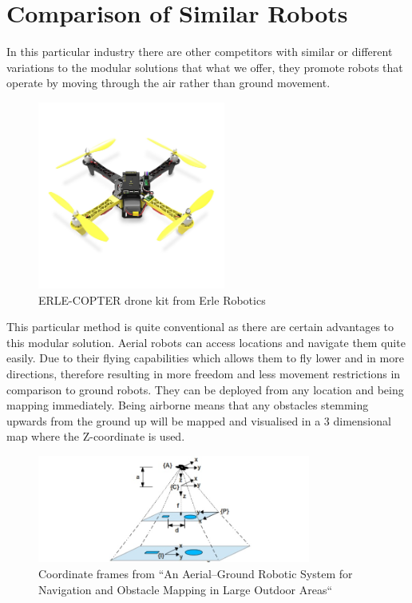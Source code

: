 \documentclass[12pt]{report}
\begin{document}
\section{Comparison of Similar Robots}
In this particular industry there are other competitors with similar or different variations to the modular solutions that what we offer, they promote robots that operate by moving through the air rather than ground movement.\par
\begin{figure}[H]
        \centering
        \includegraphics[width=0.55\textwidth]{Fig12.png}
        \caption{ERLE-COPTER drone kit from Erle Robotics}
        \label{fig:12}
\end{figure}
This particular method is quite conventional as there are certain advantages to this modular solution. Aerial robots can access locations and navigate them quite easily. Due to their flying capabilities which allows them to fly lower and in more directions, therefore resulting in more freedom and less movement restrictions in comparison to ground robots. They can be deployed from any location and being mapping immediately. Being airborne means that any obstacles stemming upwards from the ground up will be mapped and visualised in a 3 dimensional map where the Z-coordinate is used.\par
\begin{figure}[H]
        \centering
        \includegraphics[width=0.8\textwidth]{Fig13.png}
        \caption{Coordinate frames from “An Aerial–Ground Robotic System for Navigation and Obstacle Mapping in Large Outdoor Areas“}
        \label{fig:13}
\end{figure}
\end{document}
